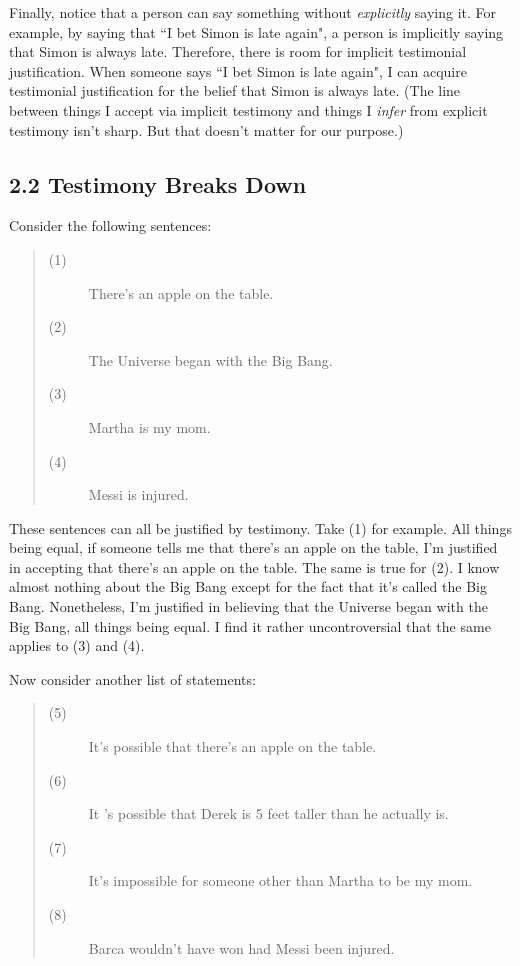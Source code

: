 \documentclass[a4paper,12pt]{article}
\begin{document}

Finally, notice that a person can say something without \emph{explicitly} saying it. For example, by saying that ``I bet Simon is late again", a person is implicitly saying that Simon is always late. Therefore, there is room for implicit testimonial justification. When someone says ``I bet Simon is late again", I can acquire testimonial justification for the belief that Simon is always late. (The line between things I accept via implicit testimony and things I \emph{infer} from explicit testimony isn't sharp. But that doesn't matter for our purpose.)

\subsection*{2.2 Testimony Breaks Down}
Consider the following sentences:
\begin{quote}
\begin{description}
\item[(1)] There's an apple on the table.
\item[(2)] The Universe began with the Big Bang.
\item[(3)] Martha is my mom.
\item[(4)] Messi is injured.
\end{description}
\end{quote}

These sentences can all be justified by testimony. Take (1) for example. All things being equal, if someone tells me that there's an apple on the table, I'm justified in accepting that there's an apple on the table. The same is true for (2). I know almost nothing about the Big Bang except for the fact that it's called the Big Bang. Nonetheless, I'm justified in believing that the Universe began with the Big Bang, all things being equal. I find it rather uncontroversial that the same applies to (3) and (4).

Now consider another list of statements:
\begin{quote}
\begin{description}
\item[(5)] It's possible that there's an apple on the table.
\item[(6)] It 's possible that Derek is 5 feet taller than he actually is.
\item[(7)] It's impossible for someone other than Martha to be my mom.
\item[(8)] Barca wouldn't have won had Messi been injured.
\end{description}
\end{quote}
\end{document}
